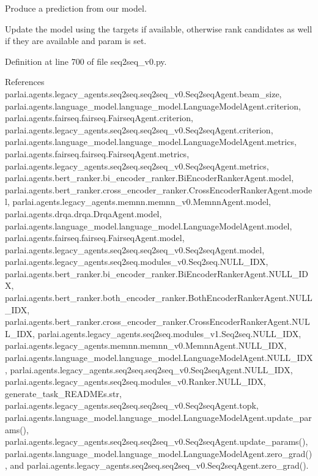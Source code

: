 \begin{DoxyVerb}Produce a prediction from our model.

Update the model using the targets if available, otherwise rank
candidates as well if they are available and param is set.
\end{DoxyVerb}
 

Definition at line 700 of file seq2seq\+\_\+v0.\+py.



References parlai.\+agents.\+legacy\+\_\+agents.\+seq2seq.\+seq2seq\+\_\+v0.\+Seq2seq\+Agent.\+beam\+\_\+size, parlai.\+agents.\+language\+\_\+model.\+language\+\_\+model.\+Language\+Model\+Agent.\+criterion, parlai.\+agents.\+fairseq.\+fairseq.\+Fairseq\+Agent.\+criterion, parlai.\+agents.\+legacy\+\_\+agents.\+seq2seq.\+seq2seq\+\_\+v0.\+Seq2seq\+Agent.\+criterion, parlai.\+agents.\+language\+\_\+model.\+language\+\_\+model.\+Language\+Model\+Agent.\+metrics, parlai.\+agents.\+fairseq.\+fairseq.\+Fairseq\+Agent.\+metrics, parlai.\+agents.\+legacy\+\_\+agents.\+seq2seq.\+seq2seq\+\_\+v0.\+Seq2seq\+Agent.\+metrics, parlai.\+agents.\+bert\+\_\+ranker.\+bi\+\_\+encoder\+\_\+ranker.\+Bi\+Encoder\+Ranker\+Agent.\+model, parlai.\+agents.\+bert\+\_\+ranker.\+cross\+\_\+encoder\+\_\+ranker.\+Cross\+Encoder\+Ranker\+Agent.\+model, parlai.\+agents.\+legacy\+\_\+agents.\+memnn.\+memnn\+\_\+v0.\+Memnn\+Agent.\+model, parlai.\+agents.\+drqa.\+drqa.\+Drqa\+Agent.\+model, parlai.\+agents.\+language\+\_\+model.\+language\+\_\+model.\+Language\+Model\+Agent.\+model, parlai.\+agents.\+fairseq.\+fairseq.\+Fairseq\+Agent.\+model, parlai.\+agents.\+legacy\+\_\+agents.\+seq2seq.\+seq2seq\+\_\+v0.\+Seq2seq\+Agent.\+model, parlai.\+agents.\+legacy\+\_\+agents.\+seq2seq.\+modules\+\_\+v0.\+Seq2seq.\+N\+U\+L\+L\+\_\+\+I\+DX, parlai.\+agents.\+bert\+\_\+ranker.\+bi\+\_\+encoder\+\_\+ranker.\+Bi\+Encoder\+Ranker\+Agent.\+N\+U\+L\+L\+\_\+\+I\+DX, parlai.\+agents.\+bert\+\_\+ranker.\+both\+\_\+encoder\+\_\+ranker.\+Both\+Encoder\+Ranker\+Agent.\+N\+U\+L\+L\+\_\+\+I\+DX, parlai.\+agents.\+bert\+\_\+ranker.\+cross\+\_\+encoder\+\_\+ranker.\+Cross\+Encoder\+Ranker\+Agent.\+N\+U\+L\+L\+\_\+\+I\+DX, parlai.\+agents.\+legacy\+\_\+agents.\+seq2seq.\+modules\+\_\+v1.\+Seq2seq.\+N\+U\+L\+L\+\_\+\+I\+DX, parlai.\+agents.\+legacy\+\_\+agents.\+memnn.\+memnn\+\_\+v0.\+Memnn\+Agent.\+N\+U\+L\+L\+\_\+\+I\+DX, parlai.\+agents.\+language\+\_\+model.\+language\+\_\+model.\+Language\+Model\+Agent.\+N\+U\+L\+L\+\_\+\+I\+DX, parlai.\+agents.\+legacy\+\_\+agents.\+seq2seq.\+seq2seq\+\_\+v0.\+Seq2seq\+Agent.\+N\+U\+L\+L\+\_\+\+I\+DX, parlai.\+agents.\+legacy\+\_\+agents.\+seq2seq.\+modules\+\_\+v0.\+Ranker.\+N\+U\+L\+L\+\_\+\+I\+DX, generate\+\_\+task\+\_\+\+R\+E\+A\+D\+M\+Es.\+str, parlai.\+agents.\+legacy\+\_\+agents.\+seq2seq.\+seq2seq\+\_\+v0.\+Seq2seq\+Agent.\+topk, parlai.\+agents.\+language\+\_\+model.\+language\+\_\+model.\+Language\+Model\+Agent.\+update\+\_\+params(), parlai.\+agents.\+legacy\+\_\+agents.\+seq2seq.\+seq2seq\+\_\+v0.\+Seq2seq\+Agent.\+update\+\_\+params(), parlai.\+agents.\+language\+\_\+model.\+language\+\_\+model.\+Language\+Model\+Agent.\+zero\+\_\+grad(), and parlai.\+agents.\+legacy\+\_\+agents.\+seq2seq.\+seq2seq\+\_\+v0.\+Seq2seq\+Agent.\+zero\+\_\+grad().



